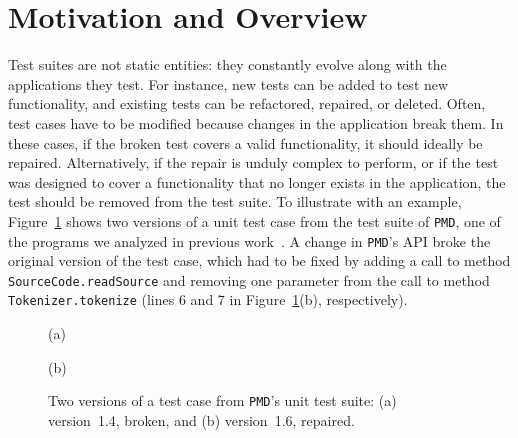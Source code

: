 \documentclass[conference]{IEEEtran}
\newcommand{\lang}[1]{\texttt{\small #1}}
\newcommand{\subject}[1]{\texttt{\small #1}}
\begin{document}



\section{Motivation and Overview}
\label{sec:intro}

Test suites are not static entities: they constantly evolve along with
the applications they test. For instance, new tests can be added to
test new functionality, and existing tests can be refactored,
repaired, or deleted. Often, test cases have to be modified because
changes in the application break them. In these cases, if the broken
test covers a valid functionality, it should ideally be repaired.
Alternatively, if the repair is unduly complex to perform, or if the
test was designed to cover a functionality that no longer exists in
the application, the test should be removed from the test suite. To
illustrate with an example, Figure~\ref{fig:pmd-javatokenizertest}
shows two versions of a unit test case from the test suite of
\subject{PMD}, one of the programs we analyzed in previous
work~\cite{pinto12}.  A change in \subject{PMD}'s API broke the
original version of the test case, which had to be fixed by adding a
call to method \lang{SourceCode.readSource} and removing one parameter
from the call to method \lang{Tokenizer.tokenize} (lines 6 and 7 in
Figure~\ref{fig:pmd-javatokenizertest}(b), respectively).

\begin{figure}[t]

\vspace*{-4pt}
\centerline{(a)}

\vspace*{-4pt}
\centerline{(b)}
\vspace*{-8pt}
\caption{Two versions of a test case from \subject{PMD}'s unit test
  suite: (a) version~1.4, broken, and (b) version~1.6, repaired.}
\vspace*{-12pt}
\label{fig:pmd-javatokenizertest}
\end{figure}
\end{document}
